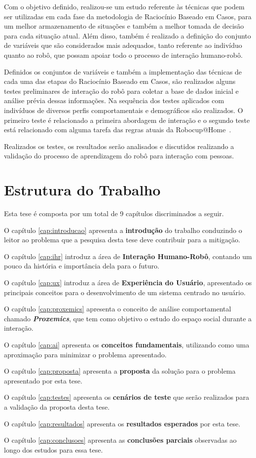 Com o objetivo definido, realizou-se um estudo referente às técnicas que podem ser utilizadas em cada fase da metodologia de Raciocínio Baseado em Casos, para um melhor armazenamento de situações e também a melhor tomada de decisão para cada situação atual. Além disso, também é realizado a definição do conjunto de variáveis que são considerados mais adequados, tanto referente ao indivíduo quanto ao robô, que possam apoiar todo o processo de interação humano-robô.

Definidos os conjuntos de variáveis e também a implementação das técnicas de cada uma das etapas do Raciocínio Baseado em Casos, são realizados alguns testes preliminares de interação do robô para coletar a base de dados inicial e análise prévia dessas informações. Na sequência dos testes aplicados com indivíduos de diversos perfis comportamentais e demográficos são realizados. O primeiro teste é relacionado a primeira abordagem de interação e o segundo teste está relacionado com alguma tarefa das regras atuais da Robocup@Home~\cite{robocup:2015}.

Realizados os testes, os resultados serão analisados e discutidos realizando a validação do processo de aprendizagem do robô para interação com pessoas.

\section{Estrutura do Trabalho}
Esta tese é composta por um total de 9 capítulos discriminados a seguir.

O capítulo \ref{cap:introducao} apresenta a \textbf{introdução} do trabalho conduzindo o leitor ao problema que a pesquisa desta tese deve contribuir para a mitigação.

O capítulo \ref{cap:ihr} introduz a área de \textbf{Interação Humano-Robô}, contando um pouco da história e importância dela para o futuro.

O capítulo \ref{cap:ux} introduz a área de \textbf{Experiência do Usuário}, apresentado os principais conceitos para o desenvolvimento de um sistema centrado no usuário.

O capítulo \ref{cap:proxemics} apresenta o conceito de análise comportamental chamado \emph{\textbf{Proxemics}}, que tem como objetivo o estudo do espaço social durante a interação.

O capítulo \ref{cap:ai} apresenta os \textbf{conceitos fundamentais}, utilizando como uma aproximação para minimizar o problema apresentado.

O capítulo \ref{cap:proposta} apresenta a \textbf{proposta} da solução para o problema apresentado por esta tese.

O capítulo \ref{cap:testes} apresenta os \textbf{cenários de teste} que serão realizados para a validação da proposta desta tese.

O capítulo \ref{cap:resultados} apresenta os \textbf{resultados esperados} por esta tese.

O capítulo \ref{cap:conclusoes} apresenta as \textbf{conclusões parciais} observadas ao longo dos estudos para essa tese.
